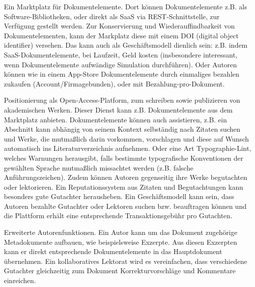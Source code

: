 Ein Marktplatz für Dokumentelemente. Dort können Dokumentelemente z.B. als Software-Bibliotheken, oder direkt als SaaS via REST-Schnittstelle, zur Verfügung gestellt werden. Zur Konservierung und Wiederauffindbarkeit von Dokumentelementen, kann der Markplatz diese mit einem DOI (digital object identifier) versehen. Das kann auch als Geschäftsmodell dienlich sein: z.B. indem SaaS-Dokumentelemente, bei Laufzeit, Geld kosten (insbesondere interessant, wenn Dokumentelemente aufwändige Simulation durchführen). Oder Autoren können wie in einem App-Store Dokumentelemente durch einmaliges bezahlen zukaufen (Account/Firmagebunden), oder mit Bezahlung-pro-Dokument.

 
Positionierung als Open-Access-Platform, zum schreiben sowie publizieren von akademischen Werken. Dieser Dienst kann z.B. Dokumentelemente aus dem Marktplatz anbieten. Dokumentelemente können auch assistieren, z.B. ein Abschnitt kann abhängig von seinem Kontext selbständig nach Zitaten suchen und Werke, die mutmaßlich darin vorkommen, vorschlagen und diese auf Wunsch automatisch ins Literaturverzeichnis aufnehmen. Oder eine Art Typographie-Lint, welches Warnungen herausgibt, falls bestimmte typografische Konventionen der gewählten Sprache mutmaßlich missachtet werden (z.B. falsche Anführungszeichen). Zudem können Autoren gegenseitig ihre Werke begutachten oder lektorieren. Ein Reputationssystem aus Zitaten und Begutachtungen kann besonders gute Gutachter herausheben. Ein Geschäftsmodell kann sein, dass Autoren bezahlte Gutachter oder Lektoren suchen bzw. beauftragen können und die Plattform erhält eine entsprechende Transaktionsgebühr pro Gutachten.

 
Erweiterte Autorenfunktionen. Ein Autor kann um das Dokument zugehörige Metadokumente aufbauen, wie beispielsweise Exzerpte. Aus diesen Exzerpten kann er direkt entsprechende Dokumentelemente in das Hauptdokument übernehmen. Ein kollaboratives Lektorat wird es vereinfachen, dass verschiedene Gutachter gleichzeitig zum Dokument Korrekturvorschläge und Kommentare einreichen.

